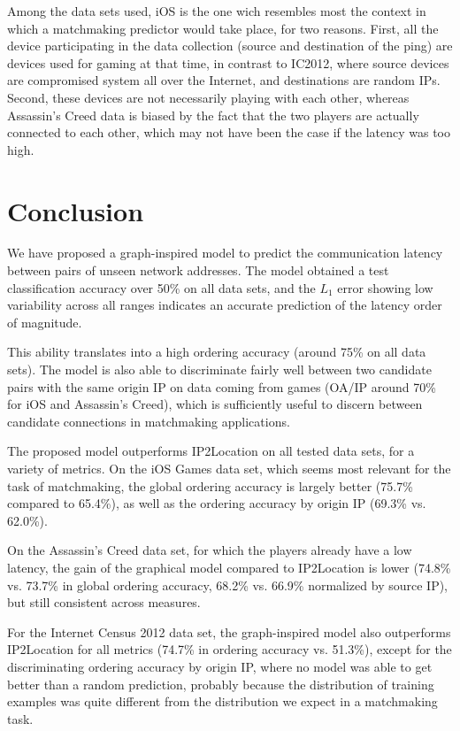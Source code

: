 \documentclass[10pt,a4paper,notitlepage,twocolumn]{article}
\begin{document}
Among the data sets used, iOS is the one wich resembles most the context
in which a matchmaking predictor would take place, for two reasons.
First, all the device participating in the data collection (source and
destination of the ping) are devices used for gaming at that time, in
contrast to IC2012, where source devices are compromised system all over
the Internet, and destinations are random IPs. Second, these devices
are not necessarily playing with each other, whereas Assassin's Creed
data is biased by the fact that the two players are actually connected
to each other, which may not have been the case if the latency was too
high.

\section{Conclusion}

We have proposed a graph-inspired model to predict the communication
latency between pairs of unseen network addresses.  The model obtained a
test classification accuracy over 50\% on all data sets, and the $L_1$
error showing low variability across all ranges indicates an accurate
prediction of the latency order of magnitude.

This ability translates into a high ordering accuracy (around 75\% on
all data sets).  The model is also able to discriminate fairly well
between two candidate pairs with the same origin IP on data coming
from games (OA/IP around 70\% for iOS and Assassin's Creed), which
is sufficiently useful to discern between candidate connections in
matchmaking applications.

The proposed model outperforms IP2Location on all tested data sets,
for a variety of metrics. On the iOS Games data set, which seems most
relevant for the task of matchmaking, the global ordering accuracy is
largely better (75.7\% compared to 65.4\%), as well as the ordering
accuracy by origin IP (69.3\% vs. 62.0\%).

On the Assassin's Creed data set, for which the players already have a
low latency, the gain of the graphical model compared to IP2Location is
lower (74.8\% vs. 73.7\% in global ordering accuracy, 68.2\% vs. 66.9\%
normalized by source IP), but still consistent across measures.

For the Internet Census 2012 data set, the graph-inspired model also
outperforms IP2Location for all metrics (74.7\% in ordering accuracy
vs. 51.3\%), except for the discriminating ordering accuracy by origin
IP, where no model was able to get better than a random prediction,
probably because the distribution of training examples was quite different
from the distribution we expect in a matchmaking task.
\end{document}
